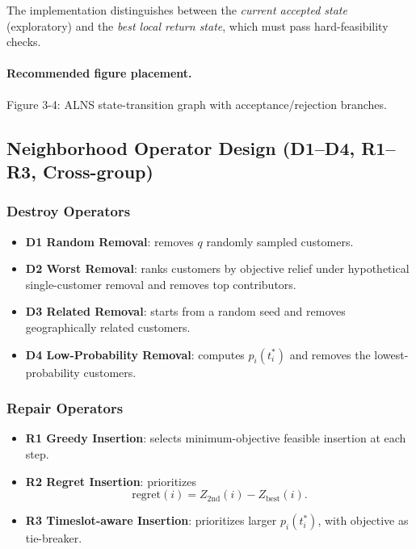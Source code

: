 \documentclass[review,12pt]{elsarticle}
\begin{document}
The implementation distinguishes between the \emph{current accepted state} (exploratory) and the \emph{best local return state}, which must pass hard-feasibility checks.

\paragraph{Recommended figure placement.}
Figure 3-4: ALNS state-transition graph with acceptance/rejection branches.

\subsection{Neighborhood Operator Design (D1--D4, R1--R3, Cross-group)}
\label{subsec:operators}

\subsubsection{Destroy Operators}
\begin{itemize}
  \item \textbf{D1 Random Removal}: removes \(q\) randomly sampled customers.
  \item \textbf{D2 Worst Removal}: ranks customers by objective relief under hypothetical single-customer removal and removes top contributors.
  \item \textbf{D3 Related Removal}: starts from a random seed and removes geographically related customers.
  \item \textbf{D4 Low-Probability Removal}: computes \(p_i(t_i^\ast)\) and removes the lowest-probability customers.
\end{itemize}

\subsubsection{Repair Operators}
\begin{itemize}
  \item \textbf{R1 Greedy Insertion}: selects minimum-objective feasible insertion at each step.
  \item \textbf{R2 Regret Insertion}: prioritizes
  \begin{equation}
  \mathrm{regret}(i)=Z_{\mathrm{2nd}}(i)-Z_{\mathrm{best}}(i).
  \label{eq:regret}
  \end{equation}
  \item \textbf{R3 Timeslot-aware Insertion}: prioritizes larger \(p_i(t_i^\ast)\), with objective as tie-breaker.
\end{itemize}
\end{document}
